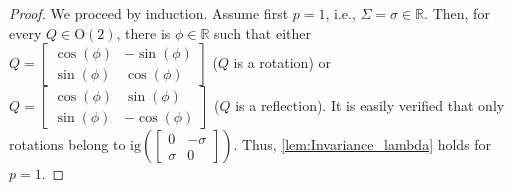 \documentclass[10pt,a4paper]{amsart}
\begin{document}
	\begin{proof}
	We proceed by induction. Assume first $p=1$, i.e., $\Sigma=\sigma \in \mathbb{R}$. Then, for every $Q\in\mathrm{O}(2)$, there is $\phi\in\mathbb{R}$ such that either  $Q=\left[\begin{smallmatrix}
		\cos(\phi)&-\sin(\phi)\\
		\sin(\phi)&\cos(\phi)
		\end{smallmatrix}\right]$ ($Q$ is a rotation) or $Q=\left[\begin{smallmatrix}
		\cos(\phi)&\sin(\phi)\\
		\sin(\phi)&-\cos(\phi)
		\end{smallmatrix}\right]$ ($Q$ is a reflection). It is easily verified that only rotations belong to $\mathrm{ig}\left(\left[\begin{smallmatrix}
		0&-\sigma\\
		\sigma&0
		\end{smallmatrix}\right]\right)$. Thus, \cref{lem:Invariance_lambda} holds for $p=1$. 
		

\end{proof}
\end{document}
